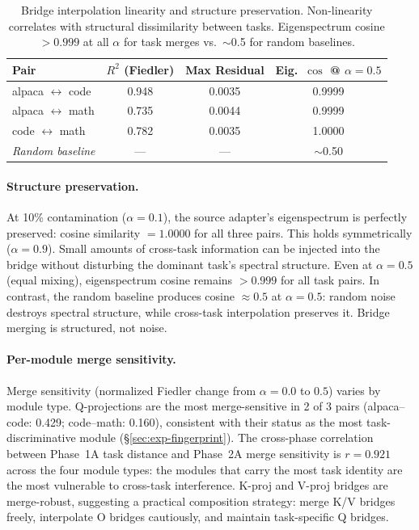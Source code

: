 \begin{table}[t]
\centering
\caption{Bridge interpolation linearity and structure preservation.
Non-linearity correlates with structural dissimilarity between tasks.
Eigenspectrum cosine $> 0.999$ at all $\alpha$ for task merges vs.\
$\sim$0.5 for random baselines.}
\label{tab:merge-linearity}
\small
\begin{tabular}{@{}lccc@{}}
\toprule
Pair & $R^2$ (Fiedler) & Max Residual & Eig.\ $\cos$ @ $\alpha\!=\!0.5$ \\
\midrule
alpaca $\leftrightarrow$ code & 0.948 & 0.0035 & 0.9999 \\
alpaca $\leftrightarrow$ math & 0.735 & 0.0044 & 0.9999 \\
code $\leftrightarrow$ math   & 0.782 & 0.0035 & 1.0000 \\
\midrule
\textit{Random baseline}      & --- & --- & $\sim$0.50 \\
\bottomrule
\end{tabular}
\end{table}

\paragraph{Structure preservation.}
At 10\% contamination ($\alpha = 0.1$), the source adapter's eigenspectrum
is perfectly preserved: cosine similarity $= 1.0000$ for all three pairs.
This holds symmetrically ($\alpha = 0.9$). Small amounts of cross-task
information can be injected into the bridge without disturbing the dominant
task's spectral structure. Even at $\alpha = 0.5$ (equal mixing),
eigenspectrum cosine remains $> 0.999$ for all task pairs. In contrast,
the random baseline produces cosine $\approx 0.5$ at $\alpha = 0.5$:
random noise destroys spectral structure, while cross-task interpolation
preserves it. Bridge merging is structured, not noise.

\paragraph{Per-module merge sensitivity.}
Merge sensitivity (normalized Fiedler change from $\alpha = 0.0$ to $0.5$)
varies by module type. Q-projections are the most merge-sensitive in 2 of
3 pairs (alpaca--code: 0.429; code--math: 0.160), consistent with their
status as the most task-discriminative module (\S\ref{sec:exp-fingerprint}).
The cross-phase correlation between Phase~1A task distance and Phase~2A
merge sensitivity is $r = 0.921$ across the four module types: the modules
that carry the most task identity are the most vulnerable to cross-task
interference. K-proj and V-proj bridges are merge-robust, suggesting a
practical composition strategy: merge K/V bridges freely, interpolate O
bridges cautiously, and maintain task-specific Q bridges.

